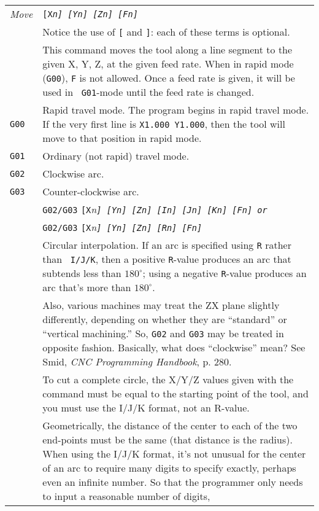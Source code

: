 \documentclass[titlepage,oneside,10pt]{article}
\begin{document}
\vskip 0.25cm
\begin{longtable}{lp{10cm}}
\em{Move} & \tt{[X}\em{n}\tt{]} \tt{[Y}\em{n}\tt{]}
\tt{[Z}\em{n}\tt{]} \tt{[F}\em{n}\tt{]} \\ 
& Notice the use of {\tt [} and {\tt ]}: each of these terms is
optional. \\
& This command moves the tool along a line segment to the given X, Y,
Z, at the given feed rate. When in rapid mode ({\tt G00}), {\tt F} is
not allowed. Once a feed rate is given, it will be used in {\tt
  G01}-mode until the feed rate is changed.\\
{\tt G00}&Rapid travel mode. The program begins in rapid travel
mode. If the very first line is {\tt X1.000 Y1.000}, then the tool
will move to that position in rapid mode.\\
{\tt G01}&Ordinary (not rapid) travel mode.\\
{\tt G02}& Clockwise arc.\\
{\tt G03}&Counter-clockwise arc. \\
& {\tt G02/G03} {\tt [X}\em{n}\tt{]} \tt{[Y}\em{n}\tt{]}
\tt{[Z}\em{n}\tt{]} {\tt [I}\em{n}\tt{]} \tt{[J}\em{n}\tt{]}
\tt{[K}\em{n}\tt{]} \tt{[F}\em{n}{\tt ]} \emph{or} \\
&{\tt G02/G03} {\tt [X}\em{n}\tt{]} \tt{[Y}\em{n}\tt{]} \tt{[Z}\em{n}\tt{]}
\tt{[R}\em{n}\tt{]} \tt{[F}\em{n}\tt{]}\\
&Circular interpolation. If an arc is specified using {\tt R} rather than {\tt
  I/J/K}, then a positive {\tt R}-value produces an arc that subtends
less than $180^\circ$; using a negative {\tt R}-value produces an arc
that's more than $180^\circ$.\\
&Also, various machines may treat the ZX plane slightly
differently, depending on whether they are ``standard'' or ``vertical
machining.'' So, {\tt G02} and {\tt G03} may be treated in opposite
fashion. Basically, what does ``clockwise'' mean? See Smid, \emph{CNC
  Programming Handbook}, p. 280.\\
&To cut a complete circle, the X/Y/Z values given with the command
must be equal to the starting point of the tool, and you must use
the I/J/K format, not an R-value.\\
&Geometrically, the distance of the center to each of the two
end-points must be the same (that distance is the radius). When using
the I/J/K format, it's not unusual for the center of an arc to require
many digits to specify exactly, perhaps even an infinite number. So
that the programmer only needs to input a reasonable number of digits,

\end{longtable}
\end{document}
